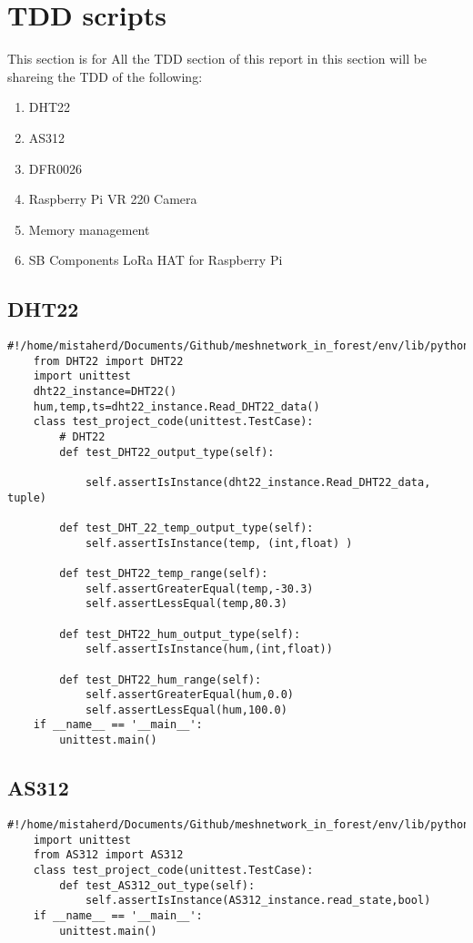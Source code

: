 \section{TDD scripts}
This section is  for All  the TDD section of  this  report in this  section will be  shareing the TDD of the following:
\begin{enumerate}
    \item DHT22
    \item AS312
    \item DFR0026
    \item Raspberry Pi VR 220 Camera
    \item Memory management
    \item SB Components LoRa HAT for Raspberry Pi
\end{enumerate}
\subsection{DHT22}
\begin{lstlisting}[style=mystyle,caption={DHT22 unit test}]
    #!/home/mistaherd/Documents/Github/meshnetwork_in_forest/env/lib/python3.11
    from DHT22 import DHT22
    import unittest
    dht22_instance=DHT22()
    hum,temp,ts=dht22_instance.Read_DHT22_data()
    class test_project_code(unittest.TestCase):
        # DHT22
        def test_DHT22_output_type(self):
           
            self.assertIsInstance(dht22_instance.Read_DHT22_data, tuple)
    
        def test_DHT_22_temp_output_type(self):
            self.assertIsInstance(temp, (int,float) )
    
        def test_DHT22_temp_range(self):
            self.assertGreaterEqual(temp,-30.3)
            self.assertLessEqual(temp,80.3)
    
        def test_DHT22_hum_output_type(self):
            self.assertIsInstance(hum,(int,float))
    
        def test_DHT22_hum_range(self):
            self.assertGreaterEqual(hum,0.0)
            self.assertLessEqual(hum,100.0) 
    if __name__ == '__main__':
        unittest.main() 
\end{lstlisting}
\newpage
\subsection{AS312}
\begin{lstlisting}[style=mystyle,caption={Code for unit test  of AS312}]
    #!/home/mistaherd/Documents/Github/meshnetwork_in_forest/env/lib/python3.11
    import unittest
    from AS312 import AS312
    class test_project_code(unittest.TestCase):
        def test_AS312_out_type(self):
            self.assertIsInstance(AS312_instance.read_state,bool)
    if __name__ == '__main__':
        unittest.main()
\end{lstlisting}
\newpage
